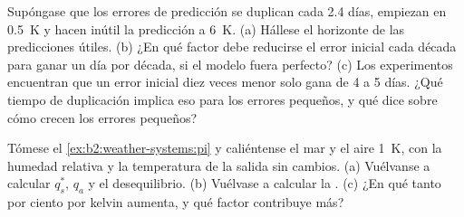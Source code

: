 \begin{exercise}[$\star\star\star$]\label{exo:b2:weather-systems:11}
Supóngase que los errores de predicción se duplican cada 2.4 días, empiezan en \qty{0.5}{K} y hacen inútil la predicción a
\qty{6}{K}. (a) Hállese el horizonte de las predicciones útiles. (b) ¿En qué factor debe
reducirse el error inicial cada década para ganar un día por década, si el modelo fuera perfecto? (c) Los experimentos encuentran que
un error inicial diez veces menor solo gana de 4 a 5 días. ¿Qué tiempo de duplicación implica eso para los
errores pequeños, y qué dice sobre cómo crecen los errores pequeños?
\end{exercise}

\begin{exercise}[$\star\star\star$]\label{exo:b2:weather-systems:12}
Tómese el \cref{ex:b2:weather-systems:pi} y caliéntense el mar y el aire \qty{1}{K}, con la
humedad relativa y la temperatura de la salida sin cambios. (a) Vuélvanse a calcular $q_s^*$, $q_a$ y el
desequilibrio. (b) Vuélvase a calcular la . (c) ¿En qué tanto por ciento por kelvin
aumenta, y qué factor contribuye más?
\end{exercise}


